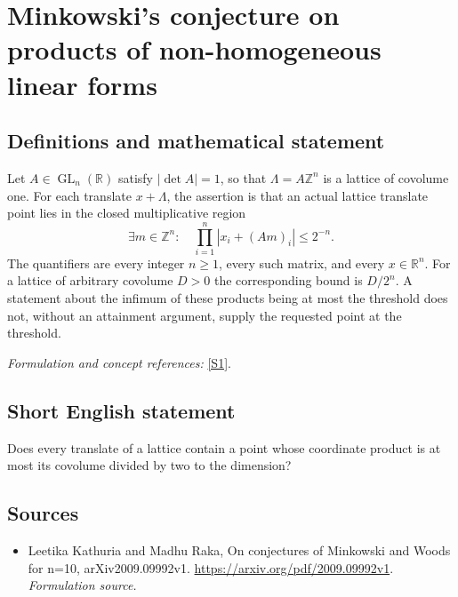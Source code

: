 \documentclass[11pt]{article}
\begin{document}
\section*{\texorpdfstring{Minkowski's conjecture on products of non-homogeneous linear forms}{Minkowski's conjecture on products of non-homogeneous linear forms}}\label{30006927}
\subsection{Definitions and mathematical statement}
Let $A\in\operatorname{GL}_n({\mathbb{R}})$ satisfy $|\det A|=1$, so that $\Lambda=A{\mathbb{Z}}^n$ is a lattice of covolume one. For each translate $x+\Lambda$, the assertion is that an actual lattice translate point lies in the closed multiplicative region
\[
 \exists m\in{\mathbb{Z}}^n:\quad \prod_{i=1}^n|x_i+(Am)_i|\le2^{-n}.
\]
The quantifiers are every integer $n\ge1$, every such matrix, and every $x\in{\mathbb{R}}^n$. For a lattice of arbitrary covolume $D>0$ the corresponding bound is $D/2^n$. A statement about the infimum of these products being at most the threshold does not, without an attainment argument, supply the requested point at the threshold.
\par\smallskip\textit{Formulation and concept references:} \href{https://arxiv.org/pdf/2009.09992v1}{[S1]}.

\subsection{Short English statement}
Does every translate of a lattice contain a point whose coordinate product is at most its covolume divided by two to the dimension?
\subsection{Sources}
\begin{itemize}
\item[S1]Leetika Kathuria and Madhu Raka, On conjectures of Minkowski and Woods for n=10, arXiv2009.09992v1.
\url{https://arxiv.org/pdf/2009.09992v1}.
\textit{Formulation source.}
\end{itemize}
\end{document}
